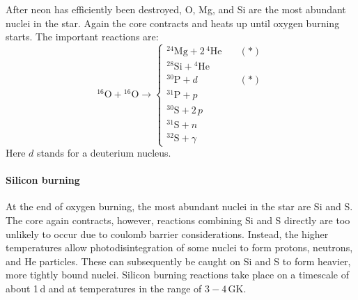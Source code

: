 After neon has efficiently been destroyed, O, Mg, and Si are the most abundant nuclei in the star. Again the core contracts and heats up until oxygen burning starts. The important reactions are:
\begin{equation}
{^{16}}\mathrm{O} + {^{16}}\mathrm{O} \longrightarrow 
    \begin{cases}
        {^{24}}\mathrm{Mg} + 2\,{^4}\mathrm{He} \quad & (*)\\
        {^{28}}\mathrm{Si} + {^4}\mathrm{He}\\
        {^{30}}\mathrm{P} + d \quad & (*)\\
        {^{31}}\mathrm{P} + p\\
        {^{30}}\mathrm{S} + 2\,p\\
        {^{31}}\mathrm{S} + n\\
        {^{32}}\mathrm{S} + \gamma
    \end{cases}
    \label{eqn:massive_stars:oxygen_burning_reactions}
\end{equation}
Here $d$ stands for a deuterium nucleus. 

\paragraph{Silicon burning}
At the end of oxygen burning, the most abundant nuclei in the star are Si and S. The core again contracts, however, reactions combining Si and S directly are too unlikely to occur due to coulomb barrier considerations. Instead, the higher temperatures allow photodisintegration of some nuclei to form protons, neutrons, and He particles. These can subsequently be caught on Si and S to form heavier, more tightly bound nuclei. Silicon burning reactions take place on a timescale of about 1\,d and at temperatures in the range of $3-4$\,GK.


